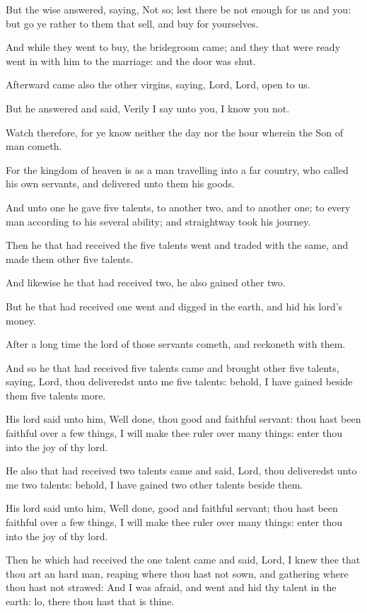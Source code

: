 \verse But the wise answered, saying, Not so; lest there be not enough for us and you: but go ye rather to them that sell, and buy for yourselves.

\verse And while they went to buy, the bridegroom came; and they that were ready went in with him to the marriage: and the door was shut.

\verse Afterward came also the other virgins, saying, Lord, Lord, open to us.

\verse But he answered and said, Verily I say unto you, I know you not.

\verse Watch therefore, for ye know neither the day nor the hour wherein the Son of man cometh.

\verse For the kingdom of heaven is as a man travelling into a far country, who called his own servants, and delivered unto them his goods.

\verse And unto one he gave five talents, to another two, and to another one; to every man according to his several ability; and straightway took his journey.

\verse Then he that had received the five talents went and traded with the same, and made them other five talents.

\verse And likewise he that had received two, he also gained other two.

\verse But he that had received one went and digged in the earth, and hid his lord's money.

\verse After a long time the lord of those servants cometh, and reckoneth with them.

\verse And so he that had received five talents came and brought other five talents, saying, Lord, thou deliveredst unto me five talents: behold, I have gained beside them five talents more.

\verse His lord said unto him, Well done, thou good and faithful servant: thou hast been faithful over a few things, I will make thee ruler over many things: enter thou into the joy of thy lord.

\verse He also that had received two talents came and said, Lord, thou deliveredst unto me two talents: behold, I have gained two other talents beside them.

\verse His lord said unto him, Well done, good and faithful servant; thou hast been faithful over a few things, I will make thee ruler over many things: enter thou into the joy of thy lord.

\verse Then he which had received the one talent came and said, Lord, I knew thee that thou art an hard man, reaping where thou hast not sown, and gathering where thou hast not strawed: \verse And I was afraid, and went and hid thy talent in the earth: lo, there thou hast that is thine.

